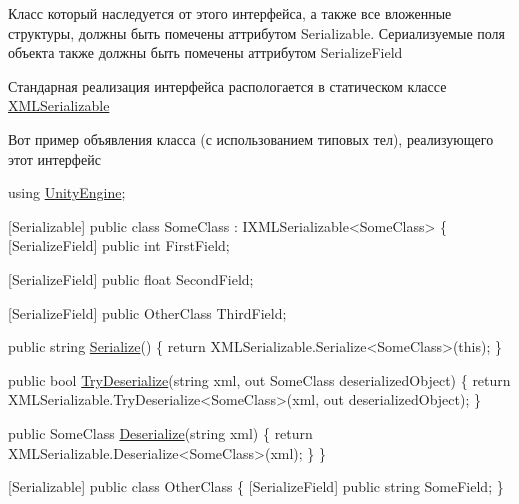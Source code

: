 Класс который наследуется от этого интерфейса, а также все вложенные структуры, должны быть помечены аттрибутом {\ttfamily Serializable}. Сериализуемые поля объекта также должны быть помечены аттрибутом {\ttfamily Serialize\+Field}

Стандарная реализация интерфейса распологается в статическом классе \hyperlink{class_hattori_game2_1_1_core_1_1_x_m_l_serializable}{X\+M\+L\+Serializable}

Вот пример объявления класса (с использованием типовых тел), реализующего этот интерфейс


\begin{DoxyCode}
\textcolor{keyword}{using} \hyperlink{namespace_unity_engine}{UnityEngine};

[Serializable]
\textcolor{keyword}{public} \textcolor{keyword}{class }SomeClass : IXMLSerializable<SomeClass>
\{
    [SerializeField]
    \textcolor{keyword}{public} \textcolor{keywordtype}{int} FirstField;

    [SerializeField]
    \textcolor{keyword}{public} \textcolor{keywordtype}{float} SecondField;

    [SerializeField]
    \textcolor{keyword}{public} OtherClass ThirdField;

    \textcolor{keyword}{public} \textcolor{keywordtype}{string} \hyperlink{interface_hattori_game2_1_1_core_1_1_i_x_m_l_serializable_a5f812f3de37013757bf9d7e8ff115a03_a5f812f3de37013757bf9d7e8ff115a03}{Serialize}()
    \{
        \textcolor{keywordflow}{return} XMLSerializable.Serialize<SomeClass>(\textcolor{keyword}{this});
    \}

    \textcolor{keyword}{public} \textcolor{keywordtype}{bool} \hyperlink{interface_hattori_game2_1_1_core_1_1_i_x_m_l_serializable_a25ffdca257af050aaa10003adbfb82f7_a25ffdca257af050aaa10003adbfb82f7}{TryDeserialize}(\textcolor{keywordtype}{string} xml, out SomeClass deserializedObject)
    \{
        \textcolor{keywordflow}{return} XMLSerializable.TryDeserialize<SomeClass>(xml, out deserializedObject);
    \}

    \textcolor{keyword}{public} SomeClass \hyperlink{interface_hattori_game2_1_1_core_1_1_i_x_m_l_serializable_a5723f1b75e6da1a0538324b68f8d1b41_a5723f1b75e6da1a0538324b68f8d1b41}{Deserialize}(\textcolor{keywordtype}{string} xml)
    \{
        \textcolor{keywordflow}{return} XMLSerializable.Deserialize<SomeClass>(xml);
    \}
\}

[Serializable]
\textcolor{keyword}{public} \textcolor{keyword}{class }OtherClass
\{
    [SerializeField]
    \textcolor{keyword}{public} \textcolor{keywordtype}{string} SomeField;
\}
\end{DoxyCode}
 


